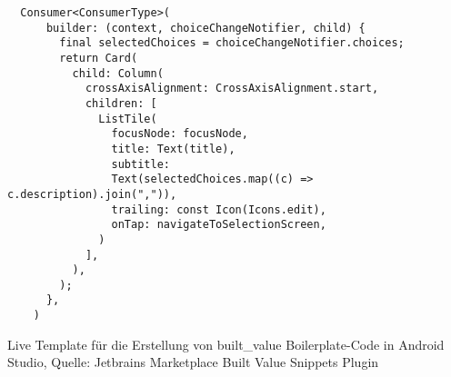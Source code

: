 \ifincludeall
  \begin{listing}[h]
    \begin{verbatim}
  Consumer<ConsumerType>(
      builder: (context, choiceChangeNotifier, child) {
        final selectedChoices = choiceChangeNotifier.choices;
        return Card(
          child: Column(
            crossAxisAlignment: CrossAxisAlignment.start,
            children: [
              ListTile(
                focusNode: focusNode,
                title: Text(title),
                subtitle:
                Text(selectedChoices.map((c) => c.description).join(",")),
                trailing: const Icon(Icons.edit),
                onTap: navigateToSelectionScreen,
              )
            ],
          ),
        );
      },
    )
\end{verbatim}
    \caption[built_value Live Template]{Live Template für die Erstellung von built_value Boilerplate-Code in Android Studio, Quelle: Jetbrains Marketplace Built Value Snippets Plugin}
    \label{lst:BuiltValueLiveTemplate}
  \end{listing}
\fi